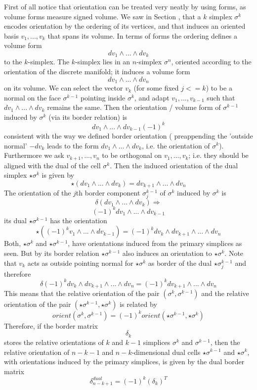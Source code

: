 \begin{appendix}
First of all notice that orientation can be treated very neatly by using forms, as volume forms measure signed volume.
We saw in Section , that a $k$ simplex $\sigma^k$ encodes orientation by the ordering of its vertices, and that induces an oriented basis $v_1,...,v_k$ that spans its volume. In terms of forms the ordering defines a volume form
\[dv_1\wedge...\wedge dv_k\]
to the $k$-simplex. The $k$-simplex lies in an $n$-simplex $\sigma^n$, oriented according to the orientation of the discrete manifold; it induces a volume form
\[dv_1\wedge ... \wedge dv_n\]
on its volume. We can select the vector $v_k$ (for some fixed $j<=k$) to be a normal on the face $\sigma^{k-1}$ pointing inside $\sigma^k$, and adapt $v_1,...,v_{k-1}$ such that $dv_1\wedge...\wedge dv_k$ remains the same. Then the orientation / volume form  of $\sigma^{k-1}$ induced by $\sigma^k$ (via its border relation) is
\[dv_1\wedge... \wedge dv_{k-1} (-1)^{k}\]
consistent with the way we defined border orientation ( preappending the 'outside normal' $-dv_k$ leads to the form $dv_1\wedge ... \wedge dv_k$, i.e. the orientation of $\sigma^k$). Furthermore we ask $v_{k+1},...,v_{n}$ to be orthogonal on $v_{1},...,v_{k}$; i.e. they should be aligned with the dual of the cell $\sigma^k$. Then the induced orientation of the dual simplex $\star \sigma^k$ is given by
\[\star (dv_1\wedge...\wedge dv_k) = dv_{k+1}\wedge...\wedge dv_{n}\]
The orientation of the $j$th border component $\sigma_j^{k-1}$ of $\sigma^k$ induced by $\sigma^k$ is
\[\delta (dv_1\wedge...\wedge dv_k) \Rightarrow\]
\[(-1)^{k}dv_1\wedge...\wedge dv_{k-1}\]
its dual $\star \sigma^{k-1}$ has the orientation
\[\star ((-1)^{k} v_1\wedge...\wedge dv_{k-1}) = (-1)^{k} dv_k \wedge dv_{k+1}\wedge ... \wedge dv_n\]
Both, $\star \sigma^k$ and $\star \sigma^{k-1}$, have orientations induced from the primary simplices as seen. But by its border relation $\star \sigma^{k-1}$ also induces an orientation to $\star \sigma^k$. Note that $v_k$ acts as outside pointing normal for $\star \sigma^k$ as border of the dual $\star \sigma_j^{k-1}$ and therefore
\[\delta (-1)^{k} dv_k \wedge dv_{k+1}\wedge ... \wedge dv_n = (-1)^{k} dv_{k+1}\wedge ... \wedge dv_n\]
This means that the relative orientation of the pair $(\sigma^k, \sigma^{k-1})$ and the relative orientation of the pair $(\star \sigma^{k-1}, \star \sigma^k)$ is related by
\[orient(\sigma^k, \sigma^{k-1}) = (-1)^{k} orient(\star \sigma^{k-1}, \star \sigma^k)\]
Therefore, if the border matrix
\[\delta_k\]
stores the relative orientations of $k$ and $k-1$ simplices $\sigma^k$ and $\sigma^{k-1}$, then the relative orientation of $n-k-1$ and $n-k$-dimensional dual cells $\star \sigma^{k-1}$  and $\star \sigma^k$, with orientations induced by the primary simplices, is given by the dual border matrix
\[\delta_{n-k+1}^{dual} = (-1)^{k} (\delta_k)^T\]


\end{appendix}